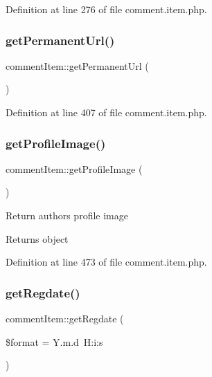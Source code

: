 Definition at line 276 of file comment.\+item.\+php.

\hypertarget{classcommentItem_adc6e6a36fd7c02a2f0fecc8a22f9b13b}{}\label{classcommentItem_adc6e6a36fd7c02a2f0fecc8a22f9b13b} 
\subsubsection{\texorpdfstring{get\+Permanent\+Url()}{getPermanentUrl()}}
{\footnotesize\ttfamily comment\+Item\+::get\+Permanent\+Url (\begin{DoxyParamCaption}{ }\end{DoxyParamCaption})}



Definition at line 407 of file comment.\+item.\+php.

\hypertarget{classcommentItem_a9baa56f4aa9515c433494778e75c9e85}{}\label{classcommentItem_a9baa56f4aa9515c433494778e75c9e85} 
\subsubsection{\texorpdfstring{get\+Profile\+Image()}{getProfileImage()}}
{\footnotesize\ttfamily comment\+Item\+::get\+Profile\+Image (\begin{DoxyParamCaption}{ }\end{DoxyParamCaption})}

Return author\textquotesingle{}s profile image \begin{DoxyReturn}{Returns}
object 
\end{DoxyReturn}


Definition at line 473 of file comment.\+item.\+php.

\hypertarget{classcommentItem_ac20123f19deb94ad33a26366195b2477}{}\label{classcommentItem_ac20123f19deb94ad33a26366195b2477} 
\subsubsection{\texorpdfstring{get\+Regdate()}{getRegdate()}}
{\footnotesize\ttfamily comment\+Item\+::get\+Regdate (\begin{DoxyParamCaption}\item[{}]{\$format = {\ttfamily \textquotesingle{}Y.m.d~H\+:i\+:s\textquotesingle{}} }\end{DoxyParamCaption})}



